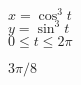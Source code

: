 {$x=\cos^3 t$\\$y=\sin^3 t$\\$0\leq t\leq 2\pi$

\noindent\begin{minipage}{\linewidth}
\centering
{}
\end{minipage}
}
{$3\pi/8$
}

